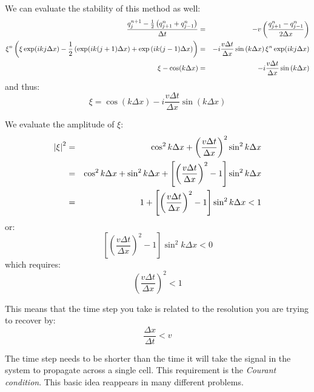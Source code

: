 We can evaluate the stability of this method as well: 
\begin{eqnarray}
  \frac{q_j^{n+1} - \frac{1}{2}\left(q_{j+1}^{n} +
    q_{j-1}^{n}\right)}{\Delta t} &=& - v \left(
  \frac{q_{j+1}^n - q_{j-1}^n}{2\Delta x} \right) \cr
  \xi^n \left(\xi \exp(i k j \Delta x) - 
  \frac{1}{2} \left(\exp(i k (j+1) \Delta x\right) +
  \exp\left(i k (j-1) \Delta x \right) \right)
  &=& - i \frac{v \Delta t}{\Delta x} 
  \sin\left(k \Delta x\right) \xi^n \exp(ikj \Delta x) \cr
  \xi - \cos(k \Delta x) 
  &=& - i \frac{v \Delta t}{\Delta x} 
  \sin\left(k \Delta x\right) 
\end{eqnarray}
and thus:
\begin{equation}
  \xi = \cos(k \Delta x) 
   - i \frac{v \Delta t}{\Delta x} 
  \sin\left(k \Delta x\right) 
\end{equation}


\begin{answer}
We evaluate the amplitude of $\xi$:
\begin{eqnarray}
\left|\xi\right|^2 &=& \cos^2 k\Delta x + \left(\frac{v \Delta t}{\Delta
  x}\right)^2 \sin^2 k \Delta x \cr
&=& \cos^2 k\Delta x + \sin^2 k \Delta x  + 
\left[\left(\frac{v \Delta t}{\Delta
  x}\right)^2 - 1\right] \sin^2 k \Delta x \cr
&=& 1 +
\left[\left(\frac{v \Delta t}{\Delta
  x}\right)^2 - 1\right] \sin^2 k \Delta x < 1
\end{eqnarray}
or:
\begin{equation}
\label{eq:courant1}
\left[\left(\frac{v \Delta t}{\Delta
  x}\right)^2 - 1\right] \sin^2 k \Delta x < 0
\end{equation}
which requires:
\begin{equation}
\left(\frac{v \Delta t}{\Delta x}\right)^2 < 1
\end{equation}

This means that the time step you take is related to the resolution
you are trying to recover by:
\begin{equation}
\frac{\Delta x}{\Delta t} < v
\end{equation}
\end{answer}


\begin{answer}
The time step needs to be shorter than the time it will take the
signal in the system to propagate across a single cell. This
requirement is the {\it Courant condition}. This basic idea reappears
in many different problems.
\end{answer}

